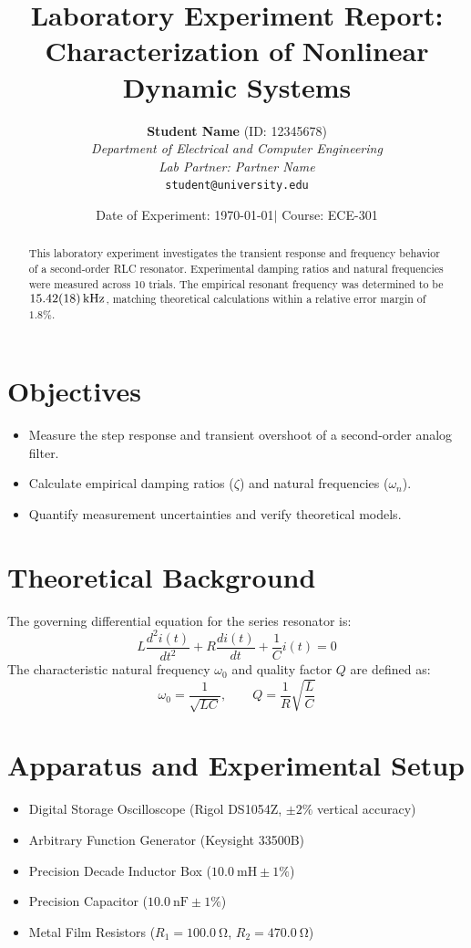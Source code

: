 \documentclass[11pt,a4paper]{article}
\title{\textbf{Laboratory Experiment Report:}\\[0.5em] \large Characterization of Nonlinear Dynamic Systems}
\author{
  \textbf{Student Name} \quad (ID: 12345678) \\
  \textit{Department of Electrical and Computer Engineering} \\
  \textit{Lab Partner: Partner Name} \\
  \texttt{student@university.edu}
}
\date{Date of Experiment: \today \quad $|$ \quad Course: ECE-301}
\begin{document}
\maketitle

\begin{abstract}
This laboratory experiment investigates the transient response and frequency behavior of a second-order RLC resonator. Experimental damping ratios and natural frequencies were measured across 10 trials. The empirical resonant frequency was determined to be $\qty{15.42 \pm 0.18}{\kilo\hertz}$, matching theoretical calculations within a relative error margin of $1.8\%$.
\end{abstract}

\section{Objectives}
\begin{itemize}
    \item Measure the step response and transient overshoot of a second-order analog filter.
    \item Calculate empirical damping ratios ($\zeta$) and natural frequencies ($\omega_n$).
    \item Quantify measurement uncertainties and verify theoretical models.
\end{itemize}

\section{Theoretical Background}
The governing differential equation for the series resonator is:
\begin{equation}
L \frac{d^2 i(t)}{dt^2} + R \frac{di(t)}{dt} + \frac{1}{C} i(t) = 0
\end{equation}
The characteristic natural frequency $\omega_0$ and quality factor $Q$ are defined as:
\begin{equation}
\omega_0 = \frac{1}{\sqrt{LC}}, \qquad Q = \frac{1}{R}\sqrt{\frac{L}{C}}
\end{equation}

\section{Apparatus and Experimental Setup}
\begin{itemize}
    \item Digital Storage Oscilloscope (Rigol DS1054Z, $\pm 2\%$ vertical accuracy)
    \item Arbitrary Function Generator (Keysight 33500B)
    \item Precision Decade Inductor Box ($\qty{10.0}{\milli\henry} \pm 1\%$)
    \item Precision Capacitor ($\qty{10.0}{\nano\farad} \pm 1\%$)
    \item Metal Film Resistors ($R_1 = \qty{100.0}{\ohm}$, $R_2 = \qty{470.0}{\ohm}$)
\end{itemize}
\end{document}
